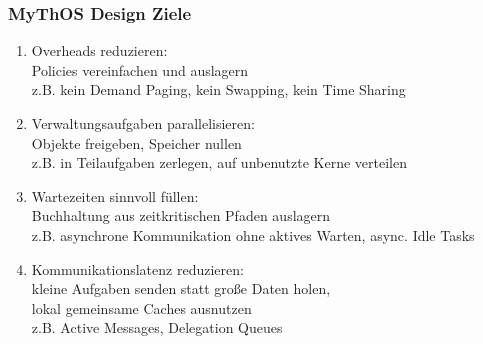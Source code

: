 \begin{frame}
  \frametitle{MyThOS Design Ziele}

  \begin{enumerate}
  \item \alert{Overheads reduzieren:}\\
    Policies vereinfachen und auslagern\\
    z.B. kein Demand Paging, kein Swapping, kein Time Sharing
  \item \alert{Verwaltungsaufgaben parallelisieren:}\\
    Objekte freigeben, Speicher nullen\\
    z.B. in Teilaufgaben zerlegen, auf unbenutzte Kerne verteilen
  \item \alert{Wartezeiten sinnvoll füllen:}\\
    Buchhaltung aus zeitkritischen Pfaden auslagern\\
    z.B. asynchrone Kommunikation ohne aktives Warten, async. Idle Tasks
  \item \alert{Kommunikationslatenz reduzieren:}\\
    kleine Aufgaben senden statt große Daten holen,\\
    lokal gemeinsame Caches ausnutzen\\
    z.B. Active Messages, Delegation Queues\\
  \end{enumerate}
\end{frame}


